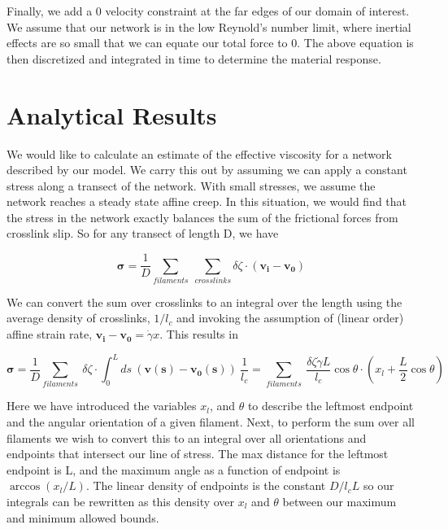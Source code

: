 \documentclass[prb,11pt]{revtex4-1}
\begin{document}
Finally, we add a 0 velocity constraint at the far edges of our domain of interest.  We assume that our network is in the low Reynold's number limit, where inertial effects are so small that we can equate our total force to 0.  The above equation is then discretized and integrated in time to determine the material response.

\section{Analytical Results}
We would like to calculate an estimate of the effective viscosity for a network described by our model.  We carry this out by assuming we can apply a constant stress along a transect of the network.  With small stresses, we assume the network reaches a steady state affine creep. In this situation, we would find that the stress in the network exactly balances the sum of the frictional forces from crosslink slip.  So for any transect of length D, we have

\begin{equation}
\mathbf{\sigma} = \frac{1}{D}\sum_{filaments}\: \sum_{crosslinks}\delta \zeta \cdot (\mathbf{v_i}-\mathbf{v_0})\end{equation}

We can convert the sum over crosslinks to an integral over the length using the average density of crosslinks, $1/l_c$ and invoking the assumption of (linear order) affine strain rate, $\mathbf{v_i}-\mathbf{v_0}=\dot \gamma x$. This results in

\begin{equation}
\mathbf{\sigma} =  \frac{1}{D}\sum_{filaments}\:  \delta \zeta \cdot \int_0^L ds \: (\mathbf{v(s)}-\mathbf{v_0(s)}) \:\frac{1}{l_c} = \sum_{filaments}\:  \frac{\delta \zeta \dot \gamma L}{l_c} \cos \theta \cdot (x_l + \frac{L}{2} \cos \theta)
\end{equation}

Here we have introduced the variables $x_l$, and $\theta$ to describe the leftmost endpoint and the angular orientation of a given filament.  Next, to perform the sum over all filaments we wish to convert this to an integral over all orientations and endpoints that intersect our line of stress. The max distance for the leftmost endpoint is L, and the maximum angle as a function of endpoint is $\arccos(x_l/L)$.  The linear density of endpoints is the constant $D/l_cL$ so our integrals can be rewritten as this density over $x_l$ and $\theta$ between our maximum and minimum allowed bounds.
\end{document}
